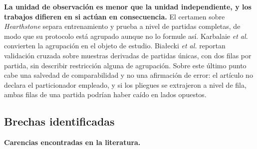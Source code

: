 \noindent\textbf{La unidad de observación es menor que la unidad
independiente, y los trabajos difieren en si actúan en consecuencia.} El
certamen sobre \emph{Hearthstone} separa entrenamiento y prueba a nivel de
partidas completas, de modo que su protocolo está agrupado aunque no lo
formule así. Karbalaie \textit{et al.} convierten la agrupación en el objeto
de estudio. Bia\l ecki \textit{et al.} reportan validación cruzada sobre
muestras derivadas de partidas únicas, con dos filas por partida, sin
describir restricción alguna de agrupación. Sobre este último punto cabe una
salvedad de comparabilidad y no una afirmación de error: el artículo no
declara el particionador empleado, y si los pliegues se extrajeron a nivel
de fila, ambas filas de una partida podrían haber caído en lados opuestos.

\subsection{Brechas identificadas}
\label{subsec:brechas}

\noindent\textbf{Carencias encontradas en la literatura.}

